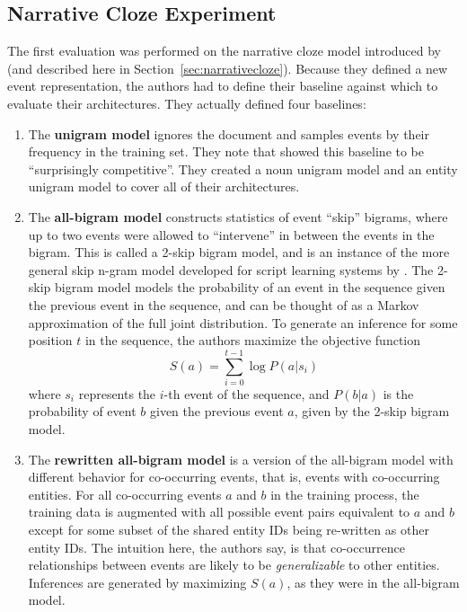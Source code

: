 \subsection{Narrative Cloze Experiment}
The first evaluation was performed on the narrative cloze model introduced by \citep{chambers2008unsupervised} (and described here in Section~\ref{sec:narrativecloze}). Because they defined a new event representation, the authors had to define their baseline against which to evaluate their architectures. They actually defined four baselines:

\begin{enumerate}
    \item The \textbf{unigram model} ignores the document and samples events by their frequency in the training set. They note that \citep{pichmoon2014} showed this baseline to be ``surprisingly competitive''. They created a noun unigram model and an entity unigram model to cover all of their architectures.
    
    \item The \textbf{all-bigram model} constructs statistics of event ``skip'' bigrams, where up to two events were allowed to ``intervene'' in between the events in the bigram. This is called a 2-skip bigram model, and is an instance of the more general skip n-gram model developed for script learning systems by \citep{jans2012skip}. The 2-skip bigram model models the probability of an event in the sequence given the previous event in the sequence, and can be thought of as a Markov approximation of the full joint distribution. To generate an inference for some position $t$ in the sequence, the authors maximize the objective function $$S(a) = \sum\limits_{i=0}^{t-1} \log P(a|s_{i})$$ where $s_{i}$ represents the $i$-th event of the sequence, and $P(b|a)$ is the probability of event $b$ given the previous event $a$, given by the 2-skip bigram model.
    
    \item The \textbf{rewritten all-bigram model} is a version of the all-bigram model with different behavior for co-occurring events, that is, events with co-occurring entities. For all co-occurring events $a$ and $b$ in the training process, the training data is augmented with all possible event pairs equivalent to $a$ and $b$ except for some subset of the shared entity IDs being re-written as other entity IDs. The intuition here, the authors say, is that co-occurrence relationships between events are likely to be \textit{generalizable} to other entities. Inferences are generated by maximizing $S(a)$, as they were in the all-bigram model.
    

\end{enumerate}
